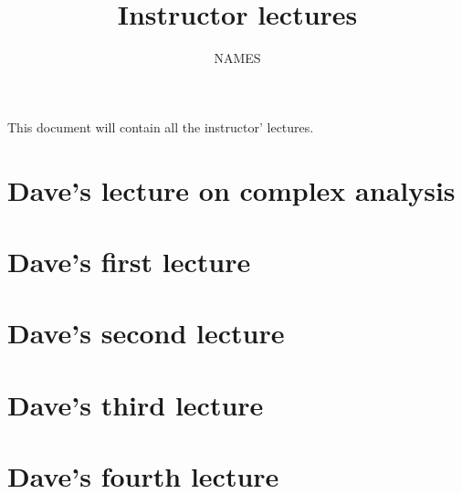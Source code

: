 \documentclass[11pt,reqno,oneside,a4paper]{article}
\title{Instructor lectures}
\author{NAMES}
\begin{document}

\maketitle
\thispagestyle{fancy}

This document will contain all the instructor' lectures.

\tableofcontents

\clearpage
\setcounter{section}{-1}
\section{Dave's lecture on complex analysis} \label{sec:lectureCA}


\clearpage
\section{Dave's first lecture} \label{sec:lecture01}


\clearpage
\section{Dave's second lecture} \label{sec:lecture02}


\clearpage
\section{Dave's third lecture} \label{sec:lecture03}


\clearpage
\section{Dave's fourth lecture} \label{sec:lecture04}

\end{document}
